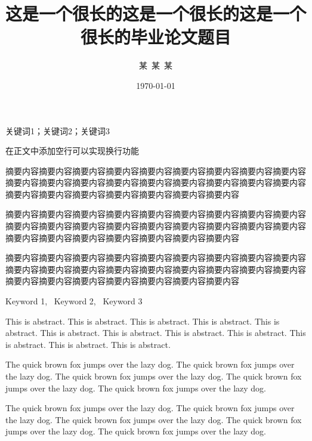 \documentclass{shnuthesis}
\title{这是一个很长的这是一个很长的这是一个很长的毕业论文题目}
\author{某~某~某} %
\date{\today} %
\begin{document}
\maketitle


\clearpage   %

\begin{cnabstract}{关键词1；关键词2；关键词3}

在正文中添加空行可以实现换行功能
		
摘要内容摘要内容摘要内容摘要内容摘要内容摘要内容摘要内容摘要内容摘要内容摘要内容摘要内容摘要内容摘要内容摘要内容摘要内容摘要内容摘要内容摘要内容摘要内容摘要内容摘要内容摘要内容摘要内容摘要内容摘要内容
		
摘要内容摘要内容摘要内容摘要内容摘要内容摘要内容摘要内容摘要内容摘要内容摘要内容摘要内容摘要内容摘要内容摘要内容摘要内容摘要内容摘要内容摘要内容摘要内容摘要内容摘要内容摘要内容摘要内容摘要内容摘要内容

摘要内容摘要内容摘要内容摘要内容摘要内容摘要内容摘要内容摘要内容摘要内容摘要内容摘要内容摘要内容摘要内容摘要内容摘要内容摘要内容摘要内容摘要内容摘要内容摘要内容摘要内容摘要内容摘要内容摘要内容摘要内容

\end{cnabstract}



\begin{enabstract}{Keyword 1,~ Keyword 2,~ Keyword 3}


This is abstract. This is abstract. This is abstract. This is abstract. This is abstract. This is abstract. This is abstract. This is abstract. This is abstract. This is abstract. This is abstract. This is abstract.
		
The quick brown fox jumps over the lazy dog. The quick brown fox jumps over the lazy dog. The quick brown fox jumps over the lazy dog. The quick brown fox jumps over the lazy dog. The quick brown fox jumps over the lazy dog.

The quick brown fox jumps over the lazy dog. The quick brown fox jumps over the lazy dog. The quick brown fox jumps over the lazy dog. The quick brown fox jumps over the lazy dog. The quick brown fox jumps over the lazy dog.

\end{enabstract}
	
\end{document}
